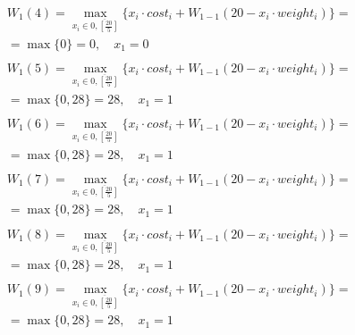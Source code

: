 \documentclass[17pt]{extarticle}
\begin{document}
\[
    \begin{aligned}
         & W_1(4)=\max_{x_i \in \overline{0, \left[\frac{20}{5}\right]}} \{x_i \cdot cost_i + W_{1-1}(20 - x_i \cdot weight_i)\}= \\& = \max \{
        0\}= 0, \quad x_1 = 0                                                                                                     \\
    \end{aligned}
\]
\[
    \begin{aligned}
         & W_1(5)=\max_{x_i \in \overline{0, \left[\frac{20}{5}\right]}} \{x_i \cdot cost_i + W_{1-1}(20 - x_i \cdot weight_i)\}= \\& = \max \{
        0, 28\}= 28, \quad x_1 = 1                                                                                                \\
    \end{aligned}
\]
\[
    \begin{aligned}
         & W_1(6)=\max_{x_i \in \overline{0, \left[\frac{20}{5}\right]}} \{x_i \cdot cost_i + W_{1-1}(20 - x_i \cdot weight_i)\}= \\& = \max \{
        0, 28\}= 28, \quad x_1 = 1                                                                                                \\
    \end{aligned}
\]
\[
    \begin{aligned}
         & W_1(7)=\max_{x_i \in \overline{0, \left[\frac{20}{5}\right]}} \{x_i \cdot cost_i + W_{1-1}(20 - x_i \cdot weight_i)\}= \\& = \max \{
        0, 28\}= 28, \quad x_1 = 1                                                                                                \\
    \end{aligned}
\]
\[
    \begin{aligned}
         & W_1(8)=\max_{x_i \in \overline{0, \left[\frac{20}{5}\right]}} \{x_i \cdot cost_i + W_{1-1}(20 - x_i \cdot weight_i)\}= \\& = \max \{
        0, 28\}= 28, \quad x_1 = 1                                                                                                \\
    \end{aligned}
\]
\[
    \begin{aligned}
         & W_1(9)=\max_{x_i \in \overline{0, \left[\frac{20}{5}\right]}} \{x_i \cdot cost_i + W_{1-1}(20 - x_i \cdot weight_i)\}= \\& = \max \{
        0, 28\}= 28, \quad x_1 = 1                                                                                                \\
    \end{aligned}
\]
\end{document}
